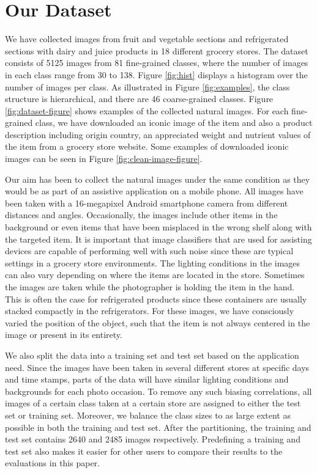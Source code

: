 \section{Our Dataset}\label{paperA:sec:our-dataset}

We have collected images from fruit and vegetable sections and refrigerated sections with dairy and juice products in 18 different grocery stores. The dataset consists of 5125 images from 81 fine-grained classes, where the number of images in each class range from 30 to 138. Figure \ref{fig:hist} displays a histogram over the number of images per class. As illustrated in Figure \ref{fig:examples}, the class structure is hierarchical, and there are 46 coarse-grained classes. Figure \ref{fig:dataset-figure} shows examples of the collected natural images. For each fine-grained class, we have downloaded an iconic image of the item and also a product description including origin country, an appreciated weight and nutrient values of the item from a grocery store website. Some examples of downloaded iconic images can be seen in Figure \ref{fig:clean-image-figure}. 

Our aim has been to collect the natural images under the same condition as they would be as part of an assistive application on a mobile phone. All images have been taken with a 16-megapixel Android smartphone camera from different distances and angles. Occasionally, the images include other items in the background or even items that have been misplaced in the wrong shelf along with the targeted item. It is important that image classifiers that are used for assisting devices are capable of performing well with such noise since these are typical settings in a grocery store environments. The lighting conditions in the images can also vary depending on where the items are located in the store. 
Sometimes the images are taken while the photographer is holding the item in the hand. This is often the case for refrigerated products since these containers are usually stacked compactly in the refrigerators. For these images, we have consciously varied the position of the object, such that the item is not always centered in the image or present in its entirety. 

We also split the data into a training set and test set based on the application need. Since the images have been taken in several different stores at specific days and time stamps, 
parts of the data will have similar lighting conditions and backgrounds for each photo occasion. To remove any such biasing correlations, all images of a certain class taken at a certain store are assigned to either the test set or training set. Moreover, we balance the class sizes to as large extent as possible in both the training and test set. After the partitioning, the training and test set contains 2640 and 2485 images respectively. Predefining a training and test set also makes it easier for other users to compare their results to the evaluations in this paper.


